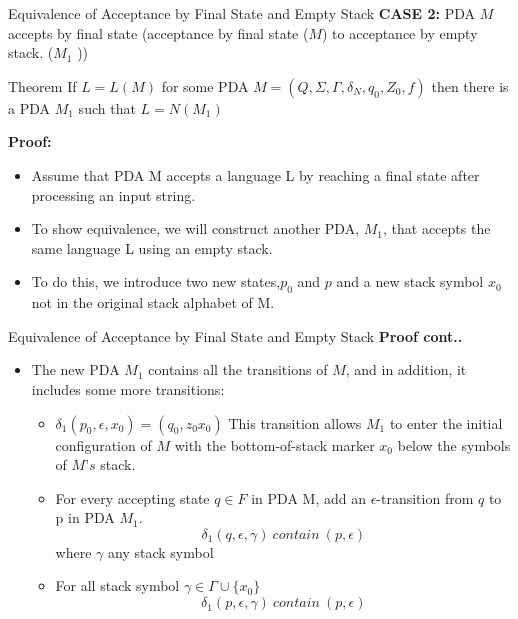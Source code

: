 \documentclass{beamer}
\begin{document}
\begin{frame}{ Equivalence of Acceptance by Final State and Empty Stack}
	\textbf{CASE 2:} PDA $M$ accepts by final state  (acceptance by  final state ($M$)  to acceptance by empty stack. ($M_1$
	))
	\begin{block}{Theorem}
		If $L = L(M)$ for some PDA $M = (Q, \Sigma, \Gamma, \delta_N, q_0, Z_0,f)$ then there is a PDA $M_1$ such that $L = N(M_1)$
	\end{block}
\textbf{Proof:}
\begin{itemize}
	\item Assume that PDA M accepts a language L by reaching a final state after processing an input string. 
	\item To show equivalence, we will construct another PDA, $M_1$, that accepts the same language L using an empty stack.
	\item To do this, we introduce two new states,$p_0$ and $p$ and a new stack symbol $x_0$ not in the original stack alphabet of M.
\end{itemize}
\end{frame}
\begin{frame}{ Equivalence of Acceptance by Final State and Empty Stack}
	\textbf{Proof cont..}
	\begin{itemize}
		\item The new PDA $M_1$ contains all the transitions of $M$, and in addition, it includes some more transitions:
		\begin{itemize}
			\item $\delta_1(p_0,\epsilon,x_0)=(q_0,z_0x_0)$ This transition allows $M_1$ to enter the initial
			configuration of $M$ with the bottom-of-stack marker $x_0$ below the
			symbols of $M’s$ stack.
			\item For every accepting state $q\in F$ in PDA M, add an $\epsilon$-transition from $q$ to p in PDA $M_1$.
			$$\delta_1(q,\epsilon,\gamma) \ contain\   (p,\epsilon)$$ where $\gamma$ any stack symbol
			\item For all stack symbol $\gamma \in \Gamma \cup \{x_0\}$
				$$\delta_1(p,\epsilon,\gamma) \ contain\   (p,\epsilon)$$
		\end{itemize}
	\end{itemize}
\end{frame}
\end{document}
